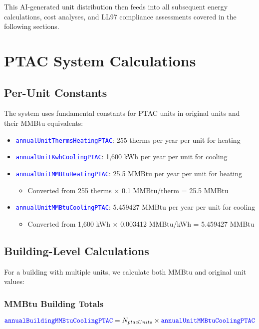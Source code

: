 \documentclass{article}
\newcommand{\code}[1]{\textcolor{blue}{\texttt{#1}}}
\begin{document}
This AI-generated unit distribution then feeds into all subsequent energy calculations, cost analyses, and LL97 compliance assessments covered in the following sections.

\section{PTAC System Calculations}

\subsection{Per-Unit Constants}

The system uses fundamental constants for PTAC units in original units and their MMBtu equivalents:

\begin{itemize}
    \item \code{annualUnitThermsHeatingPTAC}: 255 therms per year per unit for heating
    \item \code{annualUnitKwhCoolingPTAC}: 1,600 kWh per year per unit for cooling
    \item \code{annualUnitMMBtuHeatingPTAC}: 25.5 MMBtu per year per unit for heating
        \begin{itemize}
            \item Converted from 255 therms × 0.1 MMBtu/therm = 25.5 MMBtu
        \end{itemize}
    \item \code{annualUnitMMBtuCoolingPTAC}: 5.459427 MMBtu per year per unit for cooling
        \begin{itemize}
            \item Converted from 1,600 kWh × 0.003412 MMBtu/kWh = 5.459427 MMBtu
        \end{itemize}
\end{itemize}

\subsection{Building-Level Calculations}

For a building with multiple units, we calculate both MMBtu and original unit values:

\subsubsection{MMBtu Building Totals}
\begin{equation}
\code{annualBuildingMMBtuCoolingPTAC} = N_{ptacUnits} \times \code{annualUnitMMBtuCoolingPTAC}
\end{equation}
\end{document}
